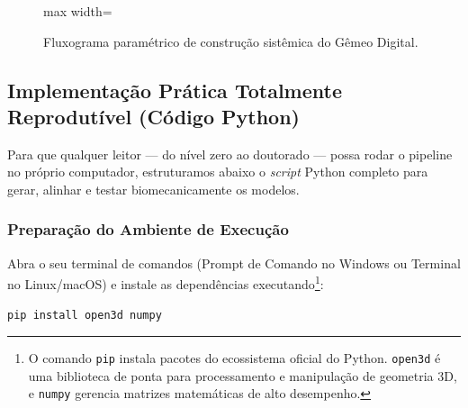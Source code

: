 \begin{figure}[h!]
    \centering
    \begin{adjustbox}{max width=\textwidth}
\end{adjustbox}
    \caption{Fluxograma paramétrico de construção sistêmica do Gêmeo Digital.}
    \label{fig:hands-on}
\end{figure}

\subsection*{Implementação Prática Totalmente Reprodutível (Código Python)}
Para que qualquer leitor — do nível zero ao doutorado — possa rodar o pipeline no próprio computador, estruturamos abaixo o \textit{script} Python completo para gerar, alinhar e testar biomecanicamente os modelos.

\subsubsection*{Preparação do Ambiente de Execução}
Abra o seu terminal de comandos (Prompt de Comando no Windows ou Terminal no Linux/macOS) e instale as dependências executando\footnote{O comando \texttt{pip} instala pacotes do ecossistema oficial do Python. \texttt{open3d} é uma biblioteca de ponta para processamento e manipulação de geometria 3D, e \texttt{numpy} gerencia matrizes matemáticas de alto desempenho.}:
\begin{lstlisting}[style=bashstyle]
pip install open3d numpy
\end{lstlisting}


